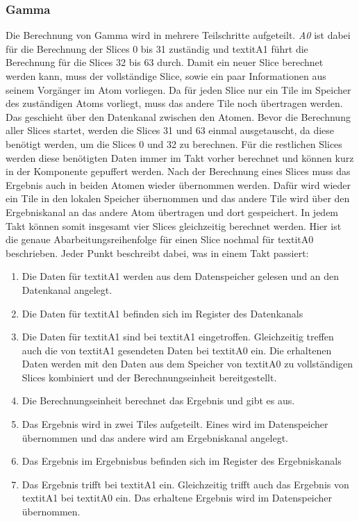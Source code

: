 \subsubsection{Gamma}
Die Berechnung von Gamma wird in mehrere Teilschritte aufgeteilt. \textit{A0} ist dabei für die Berechnung der Slices 0 bis 31 zuständig und textit{A1}
führt die Berechnung für die Slices 32 bis 63 durch. Damit ein neuer Slice berechnet werden kann, muss der vollständige Slice,
sowie ein paar Informationen aus seinem Vorgänger im Atom vorliegen. Da für jeden Slice nur ein Tile im Speicher des zuständigen Atoms vorliegt,
muss das andere Tile noch übertragen werden. Das geschieht über den Datenkanal zwischen den Atomen. Bevor die Berechnung aller Slices startet,
werden die Slices 31 und 63 einmal ausgetauscht, da diese benötigt werden, um die Slices 0 und 32 zu berechnen. Für die restlichen Slices
werden diese benötigten Daten immer im Takt vorher berechnet und können kurz in der Komponente gepuffert werden.
Nach der Berechnung eines Slices muss das Ergebnis auch in beiden Atomen wieder übernommen werden. Dafür wird wieder ein Tile in den lokalen Speicher übernommen
und das andere Tile wird über den Ergebniskanal an das andere Atom übertragen und dort gespeichert. In jedem Takt können somit insgesamt vier Slices gleichzeitig berechnet werden.
Hier ist die genaue Abarbeitungsreihenfolge für einen Slice nochmal für textit{A0} beschrieben. Jeder Punkt beschreibt dabei, was in einem Takt passiert:
\begin{enumerate}
\item Die Daten für textit{A1} werden aus dem Datenspeicher gelesen und an den Datenkanal angelegt.
\item Die Daten für textit{A1} befinden sich im Register des Datenkanals
\item Die Daten für textit{A1} sind bei textit{A1} eingetroffen. Gleichzeitig treffen auch die von textit{A1} gesendeten Daten bei textit{A0} ein.
Die erhaltenen Daten werden mit den Daten aus dem Speicher von textit{A0} zu vollständigen Slices kombiniert und der Berechnungseinheit bereitgestellt.
\item Die Berechnungseinheit berechnet das Ergebnis und gibt es aus.
\item Das Ergebnis wird in zwei Tiles aufgeteilt. Eines wird im Datenspeicher übernommen und das andere wird am Ergebniskanal angelegt.
\item Das Ergebnis im Ergebnisbus befinden sich im Register des Ergebniskanals
\item Das Ergebnis trifft bei textit{A1} ein. Gleichzeitig trifft auch das Ergebnis von textit{A1} bei textit{A0} ein.
Das erhaltene Ergebnis wird im Datenspeicher übernommen.
\end{enumerate}
